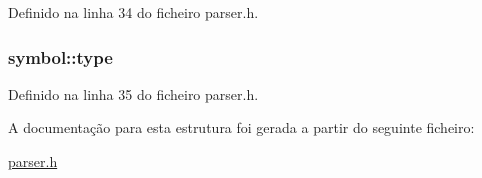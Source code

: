 Definido na linha 34 do ficheiro parser.\-h.

\hypertarget{structsymbol_adba0eaeb4bfbf4787bd3899e4202cc90}{
\subsubsection[{type}]{ symbol\-::type}}\label{structsymbol_adba0eaeb4bfbf4787bd3899e4202cc90}


Definido na linha 35 do ficheiro parser.\-h.



A documentação para esta estrutura foi gerada a partir do seguinte ficheiro\-:\begin{DoxyCompactItemize}
\item 
\hyperlink{parser_8h}{parser.\-h}\end{DoxyCompactItemize}
